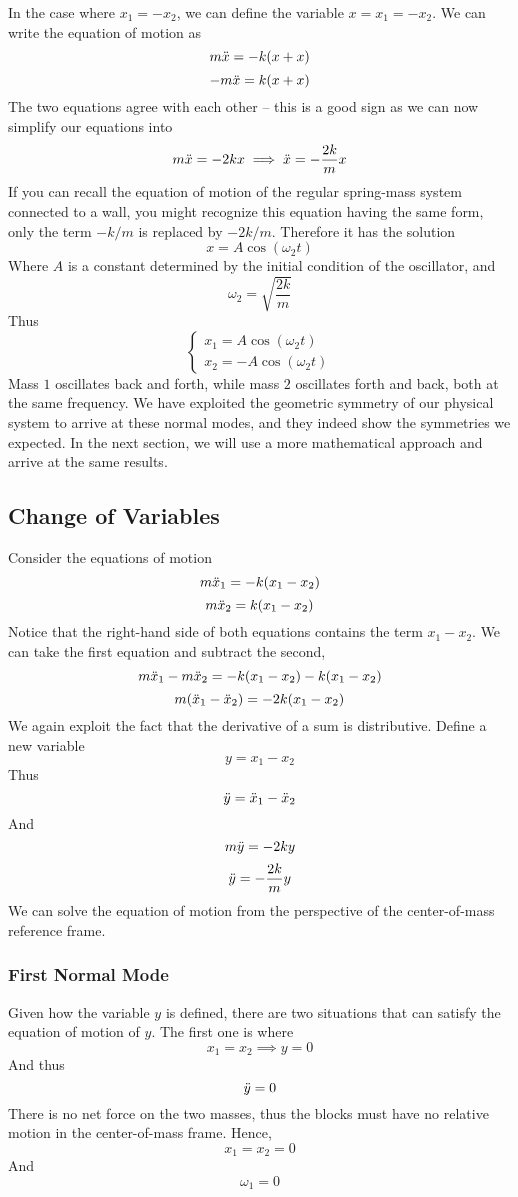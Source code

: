 \documentclass[11pt]{article}
\theoremstyle{gangnamstyle}{\newtheorem{definition}{Definition}[]}
\theoremstyle{gangnamstyle}{\newtheorem{example}{Example}[]}
\theoremstyle{gangnamstyle}{\newtheorem{problem}{Problem}[]}
\theoremstyle{gangnamstyle}{\newtheorem{warning}{Warning}[]}
\begin{document}
In the case where $x_1 = -x_2$, we can define the variable $x = x_1 = -x_2$. We can write the equation of motion as
\[ m\Ddot{x} = -k(x + x) \]
\[ -m\Ddot{x} = k(x + x) \]
The two equations agree with each other -- this is a good sign as we can now simplify our equations into
\[ m\Ddot{x} = -2kx \implies \Ddot{x} = -\frac{2k}{m}x \]
If you can recall the equation of motion of the regular spring-mass system connected to a wall, you might recognize this equation having the same form, only the term $-k / m$ is replaced by $-2k / m$. Therefore it has the solution
\[ x = A\cos(\omega_2 t) \]
Where $A$ is a constant determined by the initial condition of the oscillator, and 
\[ \omega_2 = \sqrt{\frac{2k}{m}} \]
Thus
\[ \begin{cases}
x_1 = A\cos(\omega_2 t) \\
x_2 = - A\cos(\omega_2 t)
\end{cases} \]
Mass $1$ oscillates back and forth, while mass $2$ oscillates forth and back, both at the same frequency. We have exploited the geometric symmetry of our physical system to arrive at these normal modes, and they indeed show the symmetries we expected. In the next section, we will use a more mathematical approach and arrive at the same results. \\

\subsection{Change of Variables}

Consider the equations of motion 
\[ m\Ddot{x}_1 = -k(x_1 - x_2) \]
\[ m\Ddot{x}_2 = k(x_1 - x_2) \]
Notice that the right-hand side of both equations contains the term $x_1 - x_2$. We can take the first equation and subtract the second, 
\[ m\Ddot{x}_1 - m\Ddot{x}_2 = - k(x_1 - x_2) - k(x_1 - x_2) \]
\[ m(\Ddot{x}_1 - \Ddot{x}_2) = -2k(x_1 - x_2) \]
We again exploit the fact that the derivative of a sum is distributive. Define a new variable
\[ y = x_1 - x_2 \]
Thus
\[ \Ddot{y} = \Ddot{x}_1 - \Ddot{x}_2 \]
And
\[ m\Ddot{y} = -2ky \]
\[ \Ddot{y} = -\frac{2k}{m}y \]
We can solve the equation of motion from the perspective of the center-of-mass reference frame. 

\subsubsection{First Normal Mode}

Given how the variable $y$ is defined, there are two situations that can satisfy the equation of motion of $y$. The first one is where 
\[ x_1 = x_2 \implies y = 0 \]
And thus
\[ \Ddot{y} = 0 \]
There is no net force on the two masses, thus the blocks must have no relative motion in the center-of-mass frame. Hence, 
\[ x_1 = x_2 = 0 \]
And
\[ \omega_1 = 0 \]
\end{document}
